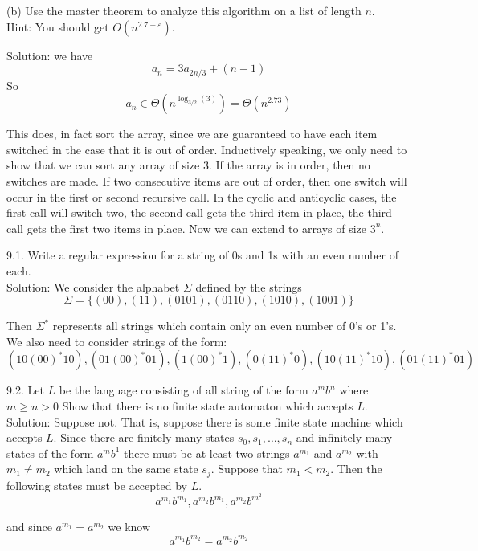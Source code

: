 \documentclass[16 pt]{amsart}
\theoremstyle{definition}
\theoremstyle{remark}
\numberwithin{equation}{subsection}
\begin{document}
(b) Use the master theorem to analyze this algorithm on a list of length $n$.\\
Hint: You should get $O(n^{2.7+\varepsilon})$.




Solution: we have
\[
a_n = 3a_{2n/3} + (n-1)
\]
So 
\[
a_n \in \Theta(n^{\log_{3/2}(3)}) = \Theta(n^{2.73})
\]

This does, in fact sort the array, since we are guaranteed to have each item switched in the case that it is out of order.  Inductively speaking, we only need to show that we can sort any array of size 3.  If the array is in order, then no switches are made.  If two consecutive items are out of order, then one switch will occur in the first or second recursive call.  In the cyclic and anticyclic cases, the first call will switch two, the second call gets the third item in place, the third call gets the first two items in place.  Now we can extend to arrays of size $3^n$. 

\newpage

9.1. Write a regular expression for a string of 0s and 1s with an even number of each.\\


Solution: We consider the alphabet $\Sigma$ defined by the strings
\[
\Sigma = \{(00),(11),(0101),(0110),(1010),(1001)\}
\]


Then $\Sigma^*$ represents all strings which contain only an even number of 0's or 1's.\\

We also need to consider strings of the form:
\[
(10(00)^*10),(01(00)^*01),(1(00)^*1),(0(11)^*0),(10(11)^*10),(01(11)^*01)
\]



9.2. Let $L$ be the language consisting of all string of the form $a^m b^n$ where $m\ge n>0$  Show that there is no finite state automaton which accepts $L$.\\


Solution:  Suppose not.  That is, suppose there is some finite state machine which accepts $L$.  Since there are finitely many states $s_0,s_1,\dots, s_n$ and infinitely many states of the form $a^m b^1$ there must be at least two strings $a^{m_1}$ and $a^{m_2}$ with $m_1\ne m_2$ which land on the same state $s_j$. Suppose that $m_1<m_2$.  Then the following states must be accepted by $L$.
\[
a^{m_1}b^{m_1}, a^{m_2}b^{m_1}, a^{m_2}b^{m^2}
\]

and since $a^{m_1}=a^{m_2}$ we know
\[
a^{m_1}b^{m_2} = a^{m_2}b^{m_2}
\]
\end{document}

